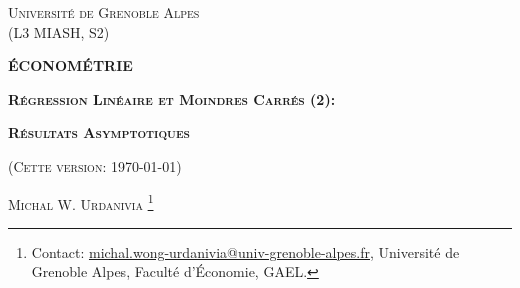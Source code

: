 \documentclass[10pt, reqno]{amsart}
\begin{document}
 
\usetikzlibrary{positioning}
\usetikzlibrary{snakes}
\usetikzlibrary{calc}
\usetikzlibrary{arrows}
\usetikzlibrary{decorations.markings}
\usetikzlibrary{shapes.misc}
\usetikzlibrary{shapes}

%

\begin{titlepage}
\centering
	{\scshape\Large \textsc{Université de Grenoble Alpes\\(L3 MIASH, S2)}\par}
	\vspace{0.5cm}
	{\Large\bfseries \scshape\Large \textsc{ÉCONOMÉTRIE}\par}
	\vspace{0.5cm}
	{\Large\bfseries \textsc{Régression Linéaire et Moindres Carrés (2): } \par}
    \vspace{1cm}   
	{\Large\bfseries \textsc{Résultats Asymptotiques} \par}
	\vspace{1cm}
	{(\textsc{Cette version: \today})\par}
	\vspace{1cm}
	{\large \textsc{Michal W. Urdanivia}
	\footnote{Contact:  
	\href{mailto:michal.wong-urdanivia@univ-grenoble-alpes.fr}{michal.wong-urdanivia@univ-grenoble-alpes.fr}, 
	 Université de Grenoble Alpes,  Faculté d'\'Economie, GAEL.}\par}
	
\end{titlepage}


\newpage

\tableofcontents

\newpage

\newpage

\tableofcontents

\newpage
\end{document}
